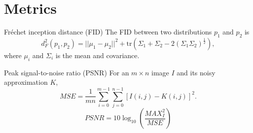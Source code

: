 \section{Metrics}
\begin{frame}{Fréchet inception distance (FID)}
The FID between two distributions $p_1$ and $p_2$ is 
$$d^2_F(p_1,p_2)=||\mu_1-\mu_2||^2+\mathrm{tr}(\Sigma_1+\Sigma_2-2(\Sigma_1\Sigma_2)^\frac{1}{2}),$$
where $\mu_i$ and $\Sigma_i$ is the mean and covariance.
\end{frame}
\begin{frame}{Peak signal-to-noise ratio (PSNR)}
    For an $m\times n$ image $I$ and its noisy approximation $K$,
    $$MSE = \dfrac{1}{mn}\sum\limits_{i=0}^{m-1}\sum\limits_{j=0}^{n-1}[I(i,j)-K(i,j)]^2.$$
    $$PSNR = 10\log_{10}\left(\dfrac{MAX_I^2}{MSE}\right)$$
\end{frame}